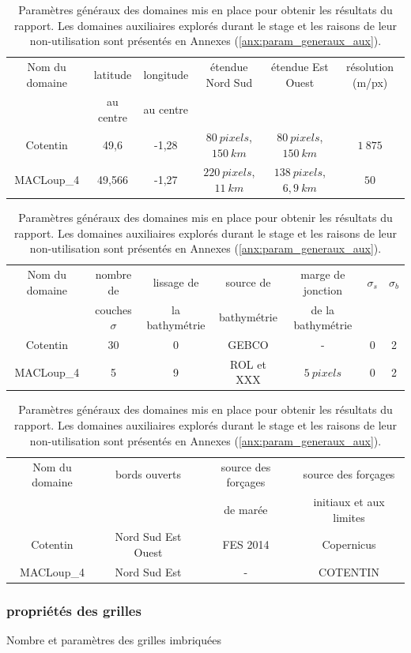 \documentclass[10pt,a4paper,titlepage]{article}
\begin{document}
\begin{table}[h!]
    \centering 
    
    \begin{tabular}{||c||c|c|c|c|c|}
        \hline
        Nom du domaine & latitude & longitude & étendue Nord Sud & étendue Est Ouest & résolution (m/px)\\
          & au centre & au centre &  &  & \\
        \hline
        Cotentin & 49,6 & -1,28 & $80~pixels$, $150~km$ & $80~pixels$, $150~km$ & $1~875$\\
        MACLoup\_4 & 49,566 & -1,27 & $220~pixels$, $11~km$ & $138~pixels$, $6,9~km$ & $50$\\
        \hline
    \end{tabular}\newline
    
    \begin{tabular}{||c||c|c|c|c|c|c|}
        \hline
        Nom du domaine & nombre de & lissage de & source de & marge de jonction & $\sigma_{s}$ & $\sigma_{b}$ \\
        & couches $\sigma$ & la bathymétrie & bathymétrie & de la bathymétrie &  & \\
        \hline
        Cotentin & 30 & 0 & GEBCO & - & 0  & 2 \\
        MACLoup\_4 & 5 & 9 & ROL et XXX & $5~pixels$ & 0 & 2 \\
        \hline
    \end{tabular}\newline
    
    \begin{tabular}{||c||c|c|c|}
    \hline
    Nom du domaine & bords ouverts & source des forçages & source des forçages \\
    &  & de marée & initiaux et aux limites \\
    \hline
    Cotentin & Nord Sud Est Ouest & FES 2014 & Copernicus \\
    MACLoup\_4 & Nord Sud Est & - & COTENTIN \\
    \hline
    \end{tabular}
    \caption{
        Paramètres généraux des domaines mis en place pour obtenir les résultats du rapport.
        Les domaines auxiliaires explorés durant le stage et les raisons de leur non-utilisation sont présentés en Annexes (\ref{anx:param_generaux_aux}).
        }
    \label{table:param_generaux}
\end{table}

\subsubsection{propriétés des grilles}
\label{subsub:propriete_gilles_ADCL}
{\color{lightgrey}
    Nombre et paramètres des grilles imbriquées
}
\end{document}
